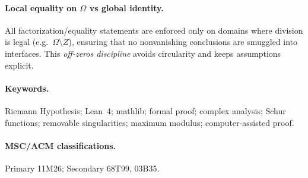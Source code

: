 \documentclass[11pt]{article}
\theoremstyle{plain}
\theoremstyle{definition}
\begin{document}
\paragraph{Local equality on \(\Omega\) vs global identity.}
All factorization/equality statements are enforced only on domains where division is legal (e.g.\ \(\Omega \setminus Z\)), ensuring that no nonvanishing conclusions are smuggled into interfaces. This \emph{off-zeros discipline} avoids circularity and keeps assumptions explicit.

\paragraph{Keywords.}
Riemann Hypothesis; Lean~4; mathlib; formal proof; complex analysis; Schur functions; removable singularities; maximum modulus; computer-assisted proof.

\paragraph{MSC/ACM classifications.}
Primary 11M26; Secondary 68T99, 03B35.
\end{document}
